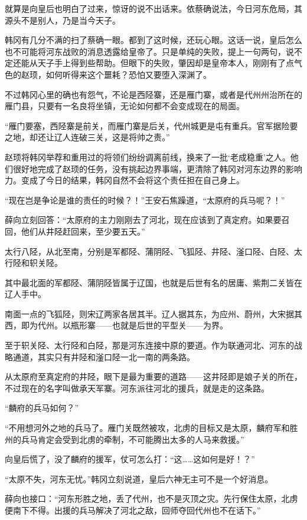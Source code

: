 就算是向皇后也明白了过来，惊讶的说不出话来。依蔡确说法，今日河东危局，其源头不是别人，乃是当今天子。

韩冈有几分不满的扫了蔡确一眼。都到了这时候，还玩心眼。这话一说，皇后怎么也不可能将河东战败的消息透露给皇帝了。只是单纯的失败，提上一句两句，说不定还能从天子手上得到些帮助。但眼下的失败，肇因却是皇帝本人，刚刚有了点气色的赵顼，如何听得来这个噩耗？恐怕又要堕入深渊了。

不过韩冈心里的确也有怨气，不论是西陉寨，还是雁门寨，或者是代州州治所在的雁门县，只要有一名良将坐镇，无论如何都不会变成现在的局面。

“雁门要塞，西陉寨是前关，而雁门寨是后关，代州城更是屯有重兵。官军据险要之地，却还让辽人连破三关，这是将帅之责。”

赵顼将韩冈举荐和重用过的将领们纷纷调离前线，换来了一批‘老成稳重’之人。他们很好地完成了赵顼的任务，没有挑起边界事端，更清除了韩冈对河东边界的影响力。变成了今日的结果，韩冈自然不会将这个责任担在自己身上。

“现在岂是争论是谁的责任的时候？！”王安石焦躁道，“太原府的兵马呢？！”

薛向立刻回答：“太原府的主力刚刚去了河北，现在应该到了真定府。如果要召回，他们从井陉赶回来，至少要五天。”

太行八陉，从北至南，分别是军都陉、蒲阴陉、飞狐陉、井陉、滏口陉、白陉、太行陉和轵关陉。

其中最北面的军都陉、蒲阴陉皆属于辽国，也就是后世有名的居庸、紫荆二关皆在辽人手中。

南面一点的飞狐陉，则宋辽两家各居其半。辽人据其东，为应州、蔚州，大宋据其西，即为代州。以瓶形寨——也就是后世的平型关——为界。

至于轵关陉、太行陉和白陉，那是河东连接中原的要道。作为联通河北、河东的战略通道，其实只有井陉和滏口陉一北一南的两条路。

从太原府至真定府的井陉，眼下是最为重要的道路——这井陉即是娘子关的所在，不过现在的名字叫做承天军寨。河东派往河北的援兵，就是走的这条路。

“麟府的兵马如何？”

“不用想河外之地的兵马了。雁门关既然被攻，北虏的目标又是太原，麟府军和胜州的兵马肯定会受到北虏的牵制，不可能腾出太多的人马来救援。”

向皇后慌了，没了麟府的援军，仗可怎么打：“这……这如何是好！？”

“太原不失，河东无忧。”韩冈立刻说道，皇后六神无主可不是一个好消息。

薛向也接口：“河东形胜之地，丢了代州，也不是灭顶之灾。先行保住太原，北虏便南下不得。出援的兵马解决了河北之敌，回师夺回代州也不在话下。”


